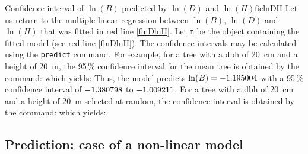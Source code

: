 \begin{filrouge}{Confidence interval of $\ln(B)$ predicted by $\ln(D)$ and
$\ln(H)$}{ficlnDH}%
Let us return to the multiple linear regression between $\ln(B)$, $\ln(D)$
and $\ln(H)$ that was fitted in red line \ref{flnDlnH}.
Let \texttt{m} be the object containing the fitted model (see red line \ref{flnDlnH}). The confidence intervals may be calculated using the \texttt{predict} command. For example, for a tree with a dbh of 20~cm and a height of 20~m, the 95\,\% confidence interval for the mean tree is obtained by the command:
%
which yields:
%
Thus, the model predicts $\ln(B)=-\mbox{1.195004}$ with a 95\,\% confidence interval of $-\mbox{1.380798}$
to $-\mbox{1.009211}$. For a tree with a dbh of 20~cm  and a height of 20~m selected at random, the confidence interval is obtained by the command:
%
which yields:
%
\end{filrouge}

\subsection{Prediction: case of a non-linear model\label{pnls}}

